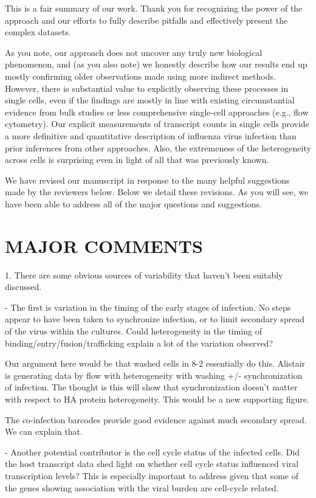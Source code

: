 \documentclass[11pt, oneside]{article}   	%
\begin{document}
{\color{black}
This is a fair summary of our work.
Thank you for recognizing the power of the approach and our efforts to fully describe pitfalls and effectively present the complex datasets.

As you note, our approach does not uncover any truly new biological phenomenon, and (as you also note) we honestly describe how our results end up mostly confirming older observations made using more indirect methods.
However, there is substantial value to explicitly observing these processes in single cells, even if the findings are mostly in line with existing circumstantial evidence from bulk studies or less comprehensive single-cell approaches (e.g., flow cytometry).
Our explicit measurements of transcript counts in single cells provide a more definitive and quantitative description of influenza virus infection than prior inferences from other approaches.
Also, the extremeness of the heterogeneity across cells is surprising even in light of all that was previously known.

We have revised our manuscript in response to the many helpful suggestions made by the reviewers below.
Below we detail these revisions.
As you will see, we have been able to address all of the major questions and suggestions.
}

\section*{MAJOR COMMENTS} 

1. There are some obvious sources of variability that haven't been suitably discussed. 

- The first is variation in the timing of the early stages of infection. No steps appear to have been taken to synchronize infection, or to limit secondary spread of the virus within the cultures. Could heterogeneity in the timing of binding/entry/fusion/trafficking explain a lot of the variation observed? 

{\color{red}
Our argument here would be that washed cells in 8-2 essentially do this. Alistair is generating data by flow with heterogeneity with washing +/- synchronization of infection. The thought is this will show that synchronization doesn't matter with respect to HA protein heterogeneity. This would be a new supporting figure.

The co-infection barcodes provide good evidence against much secondary spread. We can explain that.
}

- Another potential contributor is the cell cycle status of the infected cells. Did the host transcript data shed light on whether cell cycle status influenced viral transcription levels? This is especially important to address given that some of the genes showing association with the viral burden are cell-cycle related. 
\end{document}
